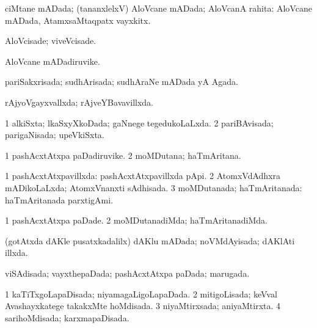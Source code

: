 {{\bentry
{} 
\gl{\gu}
\expl{}
\bmng
ciMtane mADada; (tananxlelxV) AloVcane mADada; AloVcanA rahita:  AloVcane mADada, AtamxsaMtaqpatx vayxkitx. 
\emng
\eentry

\bentry
{} 
\gl{\kirxvi}
\expl{}
\bmng
AloVcisade; viveVcisade. 
\emng
\eentry

\bentry
{} 
\gl{\nA}
\expl{}
\bmng
AloVcane mADadiruvike. 
\emng
\eentry

\bentry
{} 
\gl{\gu}
\expl{}
\bmng
pariSakxrisada; sudhArisada; sudhAraNe mADada yA Agada. 
\emng
\eentry

\bentry
{} 
\gl{\gu}
\expl{}
\bmng
rAjyoVgayxvallxda; rAjveYBavavillxda. 
\emng
\eentry

\bentry
{} 
\gl{\gu}
\expl{}
\bmng
\bnum
\num{1} alkiSxta; lkaSxyXkoDada; gaNnege tegedukoLaLxda. 
\num{2} pariBAvisada; parigaNisada; upeVkiSxta. 
\enum
\emng
\eentry

\bentry
{} 
\gl{\nA}
\expl{}
\bmng
\bnum
\num{1} pashAcxtAtxpa paDadiruvike. 
\num{2} moMDutana; haTmAritana. 
\enum
\emng
\eentry

\bentry
{} 
\gl{\gu}
\expl{}
\bmng
\bnum
\num{1} pashAcxtAtxpavillxda:  pashAcxtAtxpavillxda pApi. 
\num{2} AtomxVdAdhxra mADikoLaLxda; AtomxVnanxti sAdhisada. 
\num{3} moMDutanada; haTmAritanada:  haTmAritanada parxtigAmi. 
\enum
\emng
\eentry

\bentry
{} 
\gl{\kirxvi}
\expl{}
\bmng
\bnum
\num{1} pashAcxtAtxpa paDade. 
\num{2} moMDutanadiMda; haTmAritanadiMda. 
\enum
\emng
\eentry

\bentry
{} 
\gl{\gu}
\expl{}
\bmng
(gotAtxda dAKle pusatxkadalilx) dAKlu mADada; noVMdAyisada; dAKlAti illxda. 
\emng
\eentry

\bentry
{} 
\gl{\gu}
\expl{}
\bmng
viSAdisada; vayxthepaDada; pashAcxtAtxpa paDada; marugada. 
\emng
\eentry

\bentry
{} 
\gl{\gu}
\expl{}
\bmng
\bnum
\num{1} kaTiTxgoLapaDisada; niyamagaLigoLapaDada. 
\num{2} mitigoLisada; keVval Avashayxkatege takakxMte hoMdisada. 
\num{3} niyaMtirxsada; aniyaMtirxta. 
\num{4} sarihoMdisada; karxmapaDisada. 
\enum
\emng
\eentry

}}
